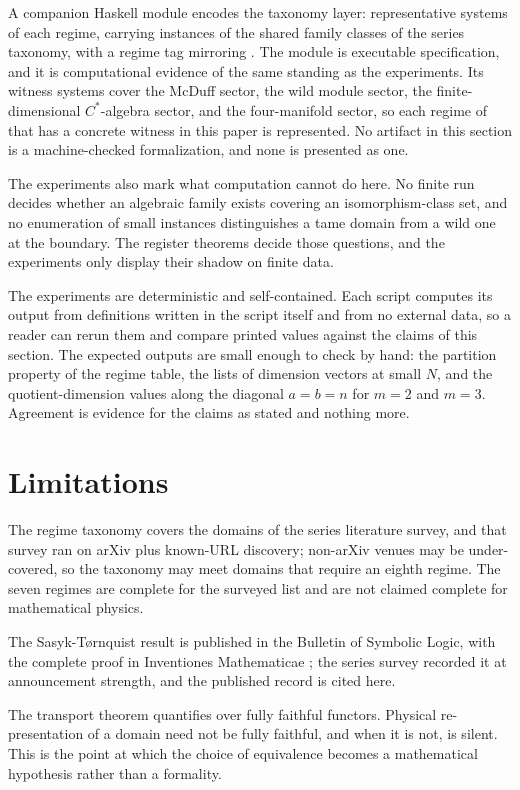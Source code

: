 \documentclass[11pt,letterpaper]{article}
\theoremstyle{definition}
\theoremstyle{remark}
\begin{document}
A companion Haskell module encodes the taxonomy layer: representative systems of each regime, carrying instances of the shared family classes of the series taxonomy, with a regime tag mirroring . The module is executable specification, and it is computational evidence of the same standing as the experiments. Its witness systems cover the McDuff sector, the wild module sector, the finite-dimensional $C^*$-algebra sector, and the four-manifold sector, so each regime of  that has a concrete witness in this paper is represented. No artifact in this section is a machine-checked formalization, and none is presented as one.

The experiments also mark what computation cannot do here. No finite run decides whether an algebraic family exists covering an isomorphism-class set, and no enumeration of small instances distinguishes a tame domain from a wild one at the boundary. The register theorems decide those questions, and the experiments only display their shadow on finite data.

The experiments are deterministic and self-contained. Each script computes its output from definitions written in the script itself and from no external data, so a reader can rerun them and compare printed values against the claims of this section. The expected outputs are small enough to check by hand: the partition property of the regime table, the lists of dimension vectors at small $N$, and the quotient-dimension values along the diagonal $a = b = n$ for $m = 2$ and $m = 3$. Agreement is evidence for the claims as stated and nothing more.

\section{Limitations}

The regime taxonomy covers the domains of the series literature survey, and that survey ran on arXiv plus known-URL discovery; non-arXiv venues may be under-covered, so the taxonomy may meet domains that require an eighth regime. The seven regimes are complete for the surveyed list and are not claimed complete for mathematical physics.

The Sasyk-Tørnquist result is published in the Bulletin of Symbolic Logic, with the complete proof in Inventiones Mathematicae \cite{sasyk2009}; the series survey recorded it at announcement strength, and the published record is cited here.

The transport theorem quantifies over fully faithful functors. Physical re-presentation of a domain need not be fully faithful, and when it is not,  is silent. This is the point at which the choice of equivalence becomes a mathematical hypothesis rather than a formality.
\end{document}
